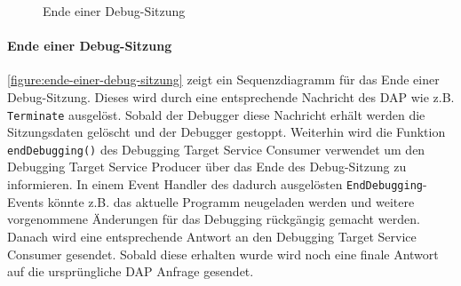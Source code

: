 \begin{figure}[tbp]
    \centering
    \caption{Ende einer Debug-Sitzung}
    \label{figure:ende-einer-debug-sitzung}
\end{figure}

\paragraph{Ende einer Debug-Sitzung} \autoref{figure:ende-einer-debug-sitzung} zeigt ein Sequenzdiagramm für das Ende einer Debug-Sitzung. Dieses wird durch eine entsprechende Nachricht des \ac{DAP} wie z.B. \texttt{Terminate} ausgelöst. Sobald der Debugger diese Nachricht erhält werden die Sitzungsdaten gelöscht und der Debugger gestoppt. Weiterhin wird die Funktion \texttt{endDebugging()} des Debugging Target Service Consumer verwendet um den Debugging Target Service Producer über das Ende des Debug-Sitzung zu informieren. In einem Event Handler des dadurch ausgelösten \texttt{EndDebugging}-Events könnte z.B. das aktuelle Programm neugeladen werden und weitere vorgenommene Änderungen für das Debugging rückgängig gemacht werden. Danach wird eine entsprechende Antwort an den Debugging Target Service Consumer gesendet. Sobald diese erhalten wurde wird noch eine finale Antwort auf die ursprüngliche \ac{DAP} Anfrage gesendet.

